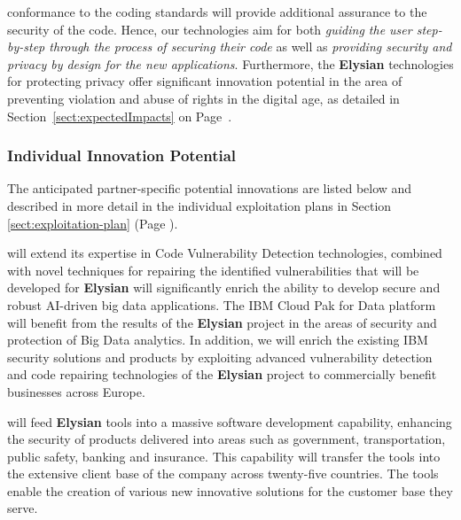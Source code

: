 \documentclass[a4paper,11pt]{article}
\newcommand{\project}[1]{\textbf{#1}\xspace}
\newcommand{\SECURITY}{\project{Elysian}}
\newcommand{\TheProject}{\SECURITY}
\begin{document}
conformance to the coding standards will provide additional assurance to the security of the code. Hence, our technologies aim for both \emph{guiding the user step-by-step through the process of securing their code} as well as \emph{providing security and privacy by design for the new applications}.  %
Furthermore, the \TheProject{} technologies for protecting privacy offer significant innovation potential in the area of preventing violation and abuse of rights in the digital age, as detailed in Section~\ref{sect:expectedImpacts} on Page~\pageref{box:gender}.

\subsubsection*{Individual Innovation Potential}

The anticipated partner-specific potential innovations are listed below and described in more detail in the individual exploitation plans in Section \ref{sect:exploitation-plan} (Page \pageref{sect:exploitation-plan}).

\begin{mdframed}[backgroundcolor=blue!5]
\IBMshort{} will extend its expertise in Code Vulnerability Detection technologies, combined with novel techniques for repairing the identified vulnerabilities that will be developed for \TheProject{} will significantly enrich the ability to develop secure and robust AI-driven big data applications. The IBM Cloud Pak for Data platform will benefit from the results of the \TheProject{} project in the areas of security and protection of Big Data analytics. In addition, we will enrich the existing IBM security solutions and products by exploiting advanced vulnerability detection and code repairing technologies of the \TheProject{} project to commercially benefit businesses across Europe.
\end{mdframed}

\begin{mdframed}[backgroundcolor=blue!5]
\SOPRAshort{} will feed \TheProject{} tools into a massive software development capability, enhancing the security of products delivered into areas such as government, transportation, public safety, banking and insurance. This capability will transfer the tools into the extensive client base of the company across twenty-five countries. The tools enable the creation of various new innovative solutions for the customer base they serve.
\end{mdframed}
\end{document}
